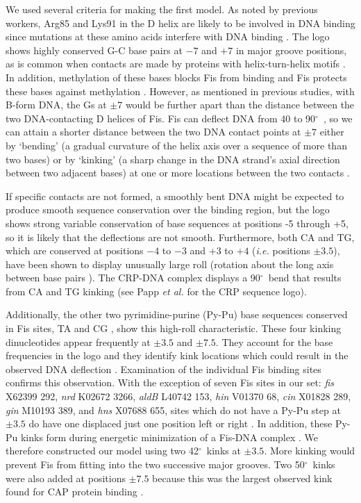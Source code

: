 \documentclass[doublespacing]{narfront}
\newcommand{\degrees}{${}^{\circ}$}
\begin{document}
We used several criteria for making the first model.
As noted by previous workers,
Arg85 and Lys91 in the D helix
are likely to be involved in DNA binding
since mutations at these amino acids
interfere with DNA binding
\cite{Kostrewa1991,Kostrewa1992}.
The logo shows highly conserved G-C base pairs at $-7$ and $+7$
in major groove positions, as is common
when contacts are made by proteins
with helix-turn-helix motifs
\cite{Yuan1991,Papp.helixrepa}.
In addition, methylation of these bases blocks Fis from binding
\cite{Bruist1987} and Fis protects these bases against methylation
\cite{Thompson1987}.
However, as mentioned in previous studies,
with B-form DNA, the Gs at
$ \pm 7$
would be further apart than the distance
between the two DNA-contacting D helices of Fis.
Fis can deflect DNA from 40 to 90\degrees\
\cite{Finkel1992,Kostrewa1991,Yuan1991,Thompson.Landy1988},
so we can attain
a shorter distance between the two DNA contact points at $\pm 7$
either by
`bending' (a gradual curvature of the helix axis over a sequence of more than
two bases) or by `kinking' (a sharp change in the DNA strand's axial
direction between two adjacent bases)
at one or more locations between the two contacts
\cite{Wu.Crothers1984}.

If specific contacts are not formed,
a smoothly bent DNA might be expected to produce smooth sequence
conservation over the binding region, but
the logo shows strong
variable 
conservation of base sequences at positions -5 through +5,
so
it is likely that
the deflections are not smooth.
Furthermore,
both
CA and TG, which are conserved at positions
$-4$ to $-3$ and $+3$ to $+4$
\cite{Kostrewa1992}
(\emph{i.e.} positions $\pm 3.5$), have been
shown to display unusually large roll (rotation about the long axis
between base pairs
\cite{Dickerson1989}).
The CRP-DNA complex displays a
90\degrees\ bend that results from CA and TG kinking
\cite{Barber1990,Schultz1991}
(see
Papp \emph{et al.}
\cite{Papp.helixrepa}
for the CRP sequence logo).

Additionally,
the other two pyrimidine-purine (Py-Pu)
base sequences conserved in Fis sites, TA \cite{Goodsell1994} and
CG \cite{Gorin1995,Suzuki.Yagi1995,Crothers.Nadeau1990,Cognet1995},
show this high-roll characteristic.
These four kinking dinucleotides appear frequently
at $\pm 3.5$ and $\pm 7.5$.
They account for
the base frequencies in the logo and they identify kink locations
which could result in the observed DNA deflection \cite{Lazarus1993}.
Examination of the individual
Fis binding sites confirms this observation.
With the exception of seven
Fis sites in our set:
\emph{fis} X62399 292,
\emph{nrd} K02672 3266,
\emph{aldB} L40742 153,
\emph{hin} V01370 68,
\emph{cin} X01828 289,
\emph{gin} M10193 389,
and
\emph{hns} X07688 655,
sites
which do not have a Py-Pu step at $\pm 3.5$
do have one displaced just one position left or right \cite{Barber1990}.
In addition, these Py-Pu kinks form during energetic minimization
of a Fis-DNA complex \cite{Sandmann1996}.
We therefore constructed our model using
two 42\degrees\ kinks at $\pm 3.5$.
More kinking would prevent Fis from fitting into
the two successive major grooves.
Two 50\degrees\ kinks were also added at positions $\pm 7.5$
because this was the largest observed kink found
for CAP protein binding \cite{Schultz1991}.
\end{document}
